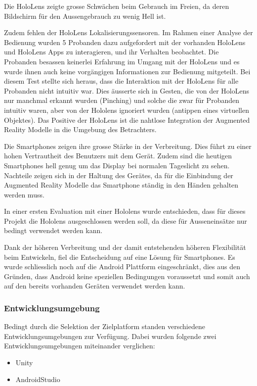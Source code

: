 \documentclass[a4paper]{scrreprt}
\begin{document}
Die HoloLens zeigte grosse Schwächen beim Gebrauch im Freien, da deren Bildschirm für den Aussengebrauch zu wenig Hell ist.

Zudem fehlen der HoloLens Lokalisierungssensoren. Im Rahmen einer Analyse der Bedienung wurden 5 Probanden dazu aufgefordert mit der vorhanden HoloLens und HoloLens Apps zu interagieren, und ihr Verhalten beobachtet. Die Probanden besassen keinerlei Erfahrung im Umgang mit der HoloLens und es wurde ihnen auch keine vorgängigen Informationen zur Bedienung mitgeteilt. Bei diesem Test stellte sich heraus, dass die Interaktion mit der HoloLens für alle Probanden nicht intuitiv war. Dies äusserte sich in Gesten, die von der HoloLens nur manchmal erkannt wurden (Pinching) und solche die zwar für Probanden intuitiv waren, aber von der Hololens ignoriert wurden (antippen eines virtuellen Objektes).
Das Positive der HoloLens ist die nahtlose Integration der Augmented Reality Modelle in die Umgebung des Betrachters. 
 
Die Smartphones zeigen ihre grosse Stärke in der Verbreitung. Dies führt zu einer hohen Vertrautheit des Benutzers mit dem Gerät. Zudem sind die heutigen Smartphones hell genug um das Display bei normalen Tageslicht zu sehen.
Nachteile zeigen sich in der Haltung des Gerätes, da für die Einbindung der Augmented Reality Modelle das Smartphone ständig in den Händen gehalten werden muss.

In einer ersten Evaluation mit einer Hololens wurde entschieden, dass für dieses Projekt die Hololens ausgeschlossen werden soll, da diese für Ausseneinsätze nur bedingt verwendet werden kann.

Dank der höheren Verbreitung und der damit entstehenden höheren Flexibilität beim Entwickeln, fiel die Entscheidung auf eine Lösung für Smartphones. Es wurde schliesslich noch auf die Android Plattform eingeschränkt, dies aus den Gründen, dass Android keine speziellen Bedingungen voraussetzt und somit auch auf den bereits vorhanden Geräten verwendet werden kann. 

\subsubsection{Entwicklungsumgebung}
\label{ssec:EvalPlattform}
Bedingt durch die Selektion der Zielplatform standen verschiedene Entwicklungsumgebungen zur Verfügung. Dabei wurden folgende zwei Entwicklungsumgebungen miteinander verglichen:
\begin{itemize}
\item Unity
\item AndroidStudio
\end{itemize}
\end{document}
